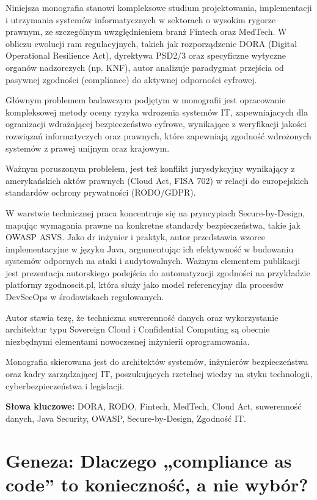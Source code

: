 \documentclass[12pt,a4paper,oneside]{book}
\begin{document}
Niniejsza monografia stanowi kompleksowe studium projektowania, implementacji i utrzymania systemów informatycznych w sektorach o wysokim rygorze prawnym, ze szczególnym uwzględnieniem branż Fintech oraz MedTech. W obliczu ewolucji ram regulacyjnych, takich jak rozporządzenie DORA (Digital Operational Resilience Act), dyrektywa PSD2/3 oraz specyficzne wytyczne organów nadzorczych (np. KNF), autor analizuje paradygmat przejścia od pasywnej zgodności (compliance) do aktywnej odporności cyfrowej.

Głównym problemem badawczym podjętym w monografii jest opracowanie kompleksowej metody oceny ryzyka wdrozenia systemów IT, zapewniajacych dla ogranizacji wdrażającej bezpieczeństwo cyfrowe, wynikające z weryfikacji jakości rozwiązań informatyczych oraz prawnych, które zapewniają zgodność wdrożonych systemów z prawej unijnym oraz krajowym.

Ważnym poruszonym problelem, jest też konflikt jurysdykcyjny wynikający z amerykańskich aktów prawnych (Cloud Act, FISA 702) w relacji do europejskich standardów ochrony prywatności (RODO/GDPR). 

W warstwie technicznej praca koncentruje się na pryncypiach Secure-by-Design, mapując wymagania prawne na konkretne standardy bezpieczeństwa, takie jak OWASP ASVS. Jako dr inżynier i praktyk, autor przedstawia wzorce implementacyjne w języku Java, argumentując ich efektywność w budowaniu systemów odpornych na ataki i audytowalnych. Ważnym elementem publikacji jest prezentacja autorskiego podejścia do automatyzacji zgodności na przykładzie platformy zgodnoscit.pl, która służy jako model referencyjny dla procesów DevSecOps w środowiskach regulowanych.







Autor stawia tezę, że techniczna suwerenność danych oraz wykorzystanie architektur typu Sovereign Cloud i Confidential Computing są obecnie niezbędnymi elementami nowoczesnej inżynierii oprogramowania.


Monografia skierowana jest do architektów systemów, inżynierów bezpieczeństwa oraz kadry zarządzającej IT, poszukujących rzetelnej wiedzy na styku technologii, cyberbezpieczeństwa i legislacji.

\textbf{Słowa kluczowe:} DORA, RODO, Fintech, MedTech, Cloud Act, suwerenność danych, Java Security, OWASP, Secure-by-Design, Zgodność IT.

\section{Geneza: Dlaczego „compliance as code” to konieczność, a nie wybór?}
\end{document}
